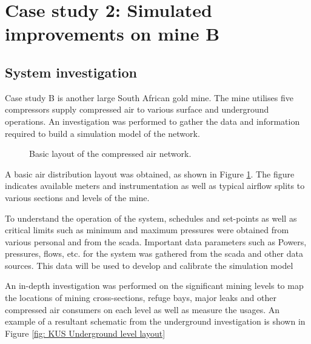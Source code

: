 \section{Case study 2: Simulated improvements on mine B}
	\subsection{System investigation}
	Case study B is another large South African gold mine. The mine utilises five compressors supply compressed air to various surface and underground operations. An investigation was performed to gather the data and information required to build a simulation model of the network.
	\par 
	\begin{figure}[h!]
		\centering
		\caption{Basic layout of the compressed air network.}
		\label{fig: KUS Air layout}
	\end{figure}
	A basic air distribution layout was obtained, as shown in Figure \ref{fig: KUS Air layout}.  The figure indicates available meters and instrumentation as well as typical airflow splits to various sections and levels of the mine.
	\par 

 To understand the operation of the system, schedules and set-points as well as critical limits such as minimum and maximum pressures were obtained from various personal and from the \gls{scada}. Important data parameters such as Powers, pressures, flows, etc. for the system was gathered from the \gls{scada} and other data sources. This data will be used to develop and calibrate the simulation model
\par 
		
	An in-depth investigation was performed on the significant mining levels to map the locations of mining cross-sections, refuge bays, major leaks and other compressed air consumers on each level as well as measure the usages. An example of a resultant schematic from the underground investigation is shown in Figure \ref{fig: KUS Underground level layout}
	
